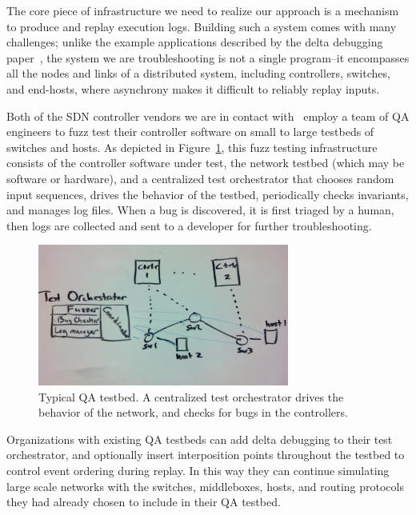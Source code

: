 The core piece of infrastructure we need to realize our approach is a
mechanism to produce and replay execution logs. Building such a system comes
with many challenges; unlike the example applications described
by the delta debugging paper~\cite{Zeller:1999:YMP:318773.318946}, the system we are troubleshooting is not a
single program--it encompasses all the nodes and links of a distributed system,
including controllers, switches, and end-hosts, where asynchrony
makes it difficult to reliably replay inputs.

Both of the SDN controller vendors we are in contact with~\cite{nicirahomepage,bigswitch} employ a team of QA
engineers to fuzz test their controller software on small to large testbeds of switches and hosts.
As depicted in Figure~\ref{fig:qa_cluster}, this fuzz testing infrastructure
consists of the controller software under test, the network testbed (which may
be software or hardware), and a centralized
test orchestrator
that chooses random input sequences, drives the behavior of the testbed,
periodically checks invariants, and manages log files. When a bug is discovered, it is first triaged
by a human, then logs are collected and sent to a developer for further troubleshooting.

\begin{figure}[t]
    \includegraphics[width=3.25in]{../diagrams/architecture/qa_cluster.jpg}
    \caption[]{\label{fig:qa_cluster} Typical QA testbed. A centralized test
    orchestrator drives the behavior of the network, and checks for bugs in
    the controllers.}
\end{figure}

Organizations with existing
QA testbeds can add delta debugging to their test
orchestrator, and optionally insert interposition points throughout the
testbed to control event ordering during replay.
In this way they can continue simulating large scale networks with
the switches, middleboxes, hosts, and routing protocols they had already
chosen to include in their QA testbed.

